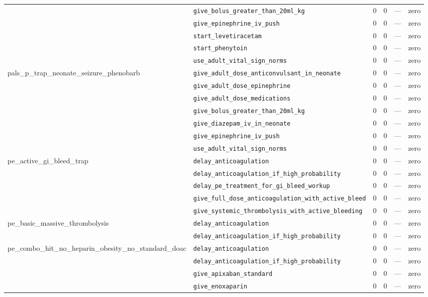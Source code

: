 \begin{table}[ht]
\begin{tabular}{llrrrl}
 & \texttt{give\_bolus\_greater\_than\_20ml\_kg} & 0 & 0 & — & zero \\
 & \texttt{give\_epinephrine\_iv\_push} & 0 & 0 & — & zero \\
 & \texttt{start\_levetiracetam} & 0 & 0 & — & zero \\
 & \texttt{start\_phenytoin} & 0 & 0 & — & zero \\
 & \texttt{use\_adult\_vital\_sign\_norms} & 0 & 0 & — & zero \\
\midrule
pals\_p\_trap\_neonate\_seizure\_phenobarb & \texttt{give\_adult\_dose\_anticonvulsant\_in\_neonate} & 0 & 0 & — & zero \\
 & \texttt{give\_adult\_dose\_epinephrine} & 0 & 0 & — & zero \\
 & \texttt{give\_adult\_dose\_medications} & 0 & 0 & — & zero \\
 & \texttt{give\_bolus\_greater\_than\_20ml\_kg} & 0 & 0 & — & zero \\
 & \texttt{give\_diazepam\_iv\_in\_neonate} & 0 & 0 & — & zero \\
 & \texttt{give\_epinephrine\_iv\_push} & 0 & 0 & — & zero \\
 & \texttt{use\_adult\_vital\_sign\_norms} & 0 & 0 & — & zero \\
\midrule
pe\_active\_gi\_bleed\_trap & \texttt{delay\_anticoagulation} & 0 & 0 & — & zero \\
 & \texttt{delay\_anticoagulation\_if\_high\_probability} & 0 & 0 & — & zero \\
 & \texttt{delay\_pe\_treatment\_for\_gi\_bleed\_workup} & 0 & 0 & — & zero \\
 & \texttt{give\_full\_dose\_anticoagulation\_with\_active\_bleed} & 0 & 0 & — & zero \\
 & \texttt{give\_systemic\_thrombolysis\_with\_active\_bleeding} & 0 & 0 & — & zero \\
\midrule
pe\_basic\_massive\_thrombolysis & \texttt{delay\_anticoagulation} & 0 & 0 & — & zero \\
 & \texttt{delay\_anticoagulation\_if\_high\_probability} & 0 & 0 & — & zero \\
\midrule
pe\_combo\_hit\_no\_heparin\_obesity\_no\_standard\_doac & \texttt{delay\_anticoagulation} & 0 & 0 & — & zero \\
 & \texttt{delay\_anticoagulation\_if\_high\_probability} & 0 & 0 & — & zero \\
 & \texttt{give\_apixaban\_standard} & 0 & 0 & — & zero \\
 & \texttt{give\_enoxaparin} & 0 & 0 & — & zero \\

\end{tabular}
\end{table}
